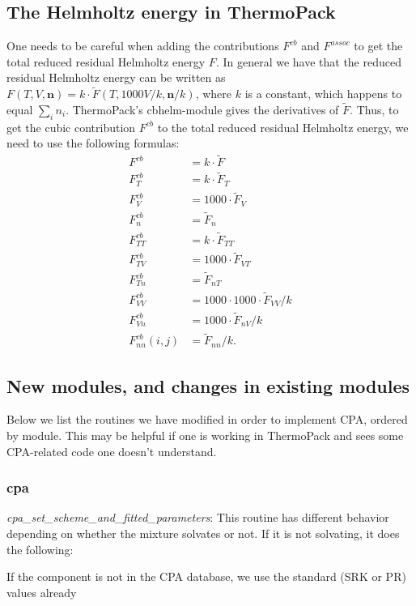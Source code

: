 \documentclass[english]{../thermomemo/thermomemo}
\newcommand{\mbf}[0]{\mathbf}
\begin{document}
\subsection{The Helmholtz energy in ThermoPack}
One needs to be careful when adding the contributions $F^{cb}$ and $F^{assoc}$ to get the total reduced residual Helmholtz energy $F$. In general we have that the reduced residual Helmholtz energy can be written as $F(T,V,\mbf n) = k \cdot \tilde F(T,1000 V/k,\mbf n/k)$, where $k$ is a constant, which happens to equal $\sum_i n_i$. ThermoPack's cbhelm-module gives the derivatives of $\tilde F$. Thus, to get the cubic contribution $F^{cb}$ to the total reduced residual Helmholtz energy, we need to use the following formulas:
\begin{align}
    F^{cb} &=  k\cdot\tilde{F} \\
    F^{cb}_T &=  k\cdot\tilde{F}_T \\
    F^{cb}_V &=  1000\cdot\tilde{F}_V \\
    F^{cb}_n &=  \tilde{F}_n \\
    F^{cb}_{TT} &= k \cdot \tilde{F}_{TT} \\
    F^{cb}_{TV} &= 1000\cdot\tilde{F}_{VT} \\
    F^{cb}_{Tn} &= \tilde{F}_{nT} \\
    F^{cb}_{VV} &= 1000\cdot1000\cdot\tilde{F}_{VV}/k \\
    F^{cb}_{Vn} &= 1000\cdot\tilde{F}_{nV}/k \\
    F^{cb}_{nn}(i,j) &= \tilde{F}_{nn}/k.
\end{align}

\subsection{New modules, and changes in existing modules}
Below we list the routines we have modified in order to implement CPA, ordered by module. This may be helpful if one is working in ThermoPack and sees some CPA-related code one doesn't understand.

\subsubsection*{cpa}
\textit{cpa\_set\_scheme\_and\_fitted\_parameters}: This routine has different behavior depending on whether the mixture solvates or not. If it is not solvating, it does the following:

If the component is not in the CPA database, we use the standard (SRK or PR) values already
\end{document}

